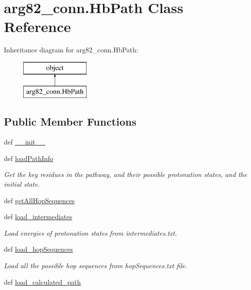 \hypertarget{classarg82__conn_1_1_hb_path}{\section{arg82\-\_\-conn.\-Hb\-Path Class Reference}
\label{classarg82__conn_1_1_hb_path}
}
Inheritance diagram for arg82\-\_\-conn.\-Hb\-Path\-:\begin{figure}[H]
\begin{center}
\leavevmode
\includegraphics[height=2.000000cm]{classarg82__conn_1_1_hb_path}
\end{center}
\end{figure}
\subsection*{Public Member Functions}
\begin{DoxyCompactItemize}
\item 
def \hyperlink{classarg82__conn_1_1_hb_path_a58bb4c090c043e019974cd3464ee3150}{\-\_\-\-\_\-init\-\_\-\-\_\-}
\item 
def \hyperlink{classarg82__conn_1_1_hb_path_a14e48479493b0d9c3476375d2ca13f9c}{load\-Path\-Info}
\begin{DoxyCompactList}\small\item\em Get the key residues in the pathway, and their possible protonation states, and the initial state. \end{DoxyCompactList}\item 
def \hyperlink{classarg82__conn_1_1_hb_path_a3dcd2c4ea4f9158095b2fcbf03345a26}{get\-All\-Hop\-Sequences}
\item 
def \hyperlink{classarg82__conn_1_1_hb_path_a784881af9af8c34a5f444d6e840238c1}{load\-\_\-intermediates}
\begin{DoxyCompactList}\small\item\em Load energies of protonation states from intermediates.\-txt. \end{DoxyCompactList}\item 
def \hyperlink{classarg82__conn_1_1_hb_path_a41dc0009b9723d4d31354bb830644b92}{load\-\_\-hop\-Sequences}
\begin{DoxyCompactList}\small\item\em Load all the possible hop sequences from hop\-Sequences.\-txt file. \end{DoxyCompactList}\item 
def \hyperlink{classarg82__conn_1_1_hb_path_a7376dc922ba91162d573fe83856d9d58}{load\-\_\-calculated\-\_\-path}
\end{DoxyCompactItemize}
